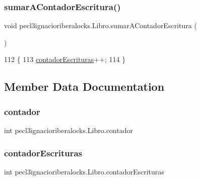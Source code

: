\subsubsection{\texorpdfstring{sumar\+A\+Contador\+Escritura()}{sumarAContadorEscritura()}}
{\footnotesize\ttfamily void pecl3ignacioriberalocks.\+Libro.\+sumar\+A\+Contador\+Escritura (\begin{DoxyParamCaption}{ }\end{DoxyParamCaption})\hspace{0.3cm}{\ttfamily [inline]}}


\begin{DoxyCode}
112     \{
113         \mbox{\hyperlink{classpecl3ignacioriberalocks_1_1_libro_a5d06fe0f5003ffac5e6e1cc8713debe6}{contadorEscrituras}}++;
114     \}
\end{DoxyCode}


\subsection{Member Data Documentation}
\mbox{\label{classpecl3ignacioriberalocks_1_1_libro_a279dfb87514394851e8eefc5497f38ca}} 
\subsubsection{\texorpdfstring{contador}{contador}}
{\footnotesize\ttfamily int pecl3ignacioriberalocks.\+Libro.\+contador\hspace{0.3cm}{\ttfamily [private]}}

\mbox{\label{classpecl3ignacioriberalocks_1_1_libro_a5d06fe0f5003ffac5e6e1cc8713debe6}} 
\subsubsection{\texorpdfstring{contador\+Escrituras}{contadorEscrituras}}
{\footnotesize\ttfamily int pecl3ignacioriberalocks.\+Libro.\+contador\+Escrituras\hspace{0.3cm}{\ttfamily [private]}}

